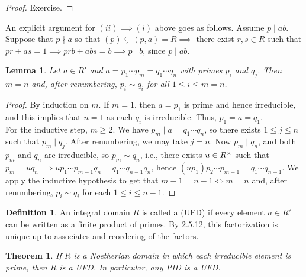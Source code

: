 \documentclass[11pt]{book}
\newcounter{counter}
\newtheorem{theorem}[counter]{Theorem}   \newtheorem*{theorem*}{Theorem}   \newtheorem{lemma}[counter]{Lemma}   \newtheorem{corollary}[counter]{Corollary}
\theoremstyle{definition}   \newtheorem{defn}[counter]{Definition} %
\newcommand{\vs}{\vspace{8pt}}
\numberwithin{counter}{chapter}
\begin{document}
\begin{proof}
Exercise.
\end{proof}

\vs

\begin{remark*}
An explicit argument for $(ii) \implies (i)$ above goes as follows. Assume $p \mid ab$. Suppose that $p \nmid a$ so that $(p) \subsetneq (p,a) = R \implies$ there exist $r,s \in R$ such that $pr + as = 1 \implies prb + abs = b \implies p \mid b$, since $p \mid ab$.
\end{remark*}

\vs

\begin{lemma}
Let $a \in R'$ and $a = p_1 \cdots p_m = q_1 \cdots q_n$ with primes $p_i$ and $q_j$. Then $m = n$ and, after renumbering, $p_i \sim q_i$ for all $1 \leq i \leq m = n$.
\end{lemma}

\begin{proof}
By induction on $m$. If $m = 1$, then $a = p_1$ is prime and hence irreducible, and this implies that $n = 1$ as each $q_i$ is irreducible. Thus, $p_1 = a = q_1$. \\

For the inductive step, $m \geq 2$. We have $p_m \mid a = q_1 \cdots q_n$, so there exists $1 \leq j \leq n$ such that $p_m \mid q_j$. After renumbering, we may take $j = n$. Now $p_m \mid q_n$, and both $p_m$ and $q_n$ are irreducible, so $p_m \sim q_n$, i.e., there exists $u \in R^{\times}$ such that $p_m = u q_n \implies u p_1 \cdots p_{m-1} q_n = q_1 \cdots q_{n-1} q_n$, hence $(up_1) p_2 \cdots p_{m-1} = q_1 \cdots q_{n-1}$. We apply the inductive hypothesis to get that $m-1 = n-1 \iff m = n$ and, after renumbering, $p_i \sim q_i$ for each $1 \leq i \leq n-1$.
\end{proof}

\vs

\begin{defn}
An integral domain $R$ is called a  (UFD) if every element $a \in R'$ can be written as a finite product of primes. By 2.5.12, this factorization is unique up to associates and reordering of the factors.
\end{defn}

\vs

\begin{theorem}
If $R$ is a Noetherian domain in which each irreducible element is prime, then $R$ is a UFD. In particular, any PID is a UFD.
\end{theorem}
\end{document}
